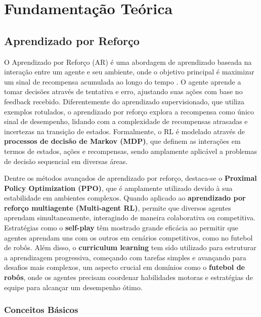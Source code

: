 \chapter{Fundamentação Teórica}
\label{cap:fund}

\section{Aprendizado por Reforço}
\label{sec:rl}

O Aprendizado por Reforço (AR) é uma abordagem de aprendizado baseada na interação entre um agente e seu ambiente, onde o objetivo principal é maximizar um sinal de recompensa acumulada ao longo do tempo \cite{sutton}. O agente aprende a tomar decisões através de tentativa e erro, ajustando suas ações com base no feedback recebido. Diferentemente do aprendizado supervisionado, que utiliza exemplos rotulados, o aprendizado por reforço explora a recompensa como único sinal de desempenho, lidando com a complexidade de recompensas atrasadas e incertezas na transição de estados. Formalmente, o RL é modelado através de \textbf{processos de decisão de Markov (MDP)}, que definem as interações em termos de estados, ações e recompensas, sendo amplamente aplicável a problemas de decisão sequencial em diversas áreas.

Dentre os métodos avançados de aprendizado por reforço, destaca-se o \textbf{Proximal Policy Optimization (PPO)}, que é amplamente utilizado devido à sua estabilidade em ambientes complexos. Quando aplicado ao \textbf{aprendizado por reforço multiagente (Multi-agent RL)}, permite que diversos agentes aprendam simultaneamente, interagindo de maneira colaborativa ou competitiva. Estratégias como o \textbf{self-play} têm mostrado grande eficácia ao permitir que agentes aprendam uns com os outros em cenários competitivos, como no futebol de robôs. Além disso, o \textbf{curriculum learning} tem sido utilizado para estruturar a aprendizagem progressiva, começando com tarefas simples e avançando para desafios mais complexos, um aspecto crucial em domínios como o \textbf{futebol de robôs}, onde os agentes precisam coordenar habilidades motoras e estratégias de equipe para alcançar um desempenho ótimo.

\subsection{Conceitos Básicos}
\label{subsec:rl_conceitos}

